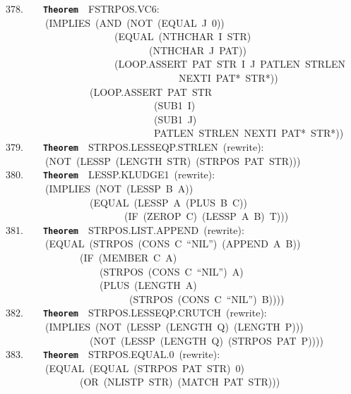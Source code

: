 \documentclass[11pt]{book}
\newenvironment{pubasis}{\begin{flushleft}\ttfamily\small}{\normalsize\rmfamily\end{flushleft}}
\newcommand{\axiomordefinition}[1]{\vspace{6pt}\texttt{\textbf{#1}}}
\begin{document}
\begin{pubasis}
378.~~~~\axiomordefinition{Theorem}~~FSTRPOS.VC6:\\
~~~~~~~~(IMPLIES~(AND~(NOT~(EQUAL~J~0))\\
~~~~~~~~~~~~~~~~~~~~~~(EQUAL~(NTHCHAR~I~STR)\\
~~~~~~~~~~~~~~~~~~~~~~~~~~~~~(NTHCHAR~J~PAT))\\
~~~~~~~~~~~~~~~~~~~~~~(LOOP.ASSERT~PAT~STR~I~J~PATLEN~STRLEN\\
~~~~~~~~~~~~~~~~~~~~~~~~~~~~~~~~~~~NEXTI~PAT*~STR*))\\
~~~~~~~~~~~~~~~~~(LOOP.ASSERT~PAT~STR\\
~~~~~~~~~~~~~~~~~~~~~~~~~~~~~~(SUB1~I)\\
~~~~~~~~~~~~~~~~~~~~~~~~~~~~~~(SUB1~J)\\
~~~~~~~~~~~~~~~~~~~~~~~~~~~~~~PATLEN~STRLEN~NEXTI~PAT*~STR*))\\

379.~~~~\axiomordefinition{Theorem}~~STRPOS.LESSEQP.STRLEN~(rewrite):\\
~~~~~~~~(NOT~(LESSP~(LENGTH~STR)~(STRPOS~PAT~STR)))\\

380.~~~~\axiomordefinition{Theorem}~~LESSP.KLUDGE1~(rewrite):\\
~~~~~~~~(IMPLIES~(NOT~(LESSP~B~A))\\
~~~~~~~~~~~~~~~~~(EQUAL~(LESSP~A~(PLUS~B~C))\\
~~~~~~~~~~~~~~~~~~~~~~~~(IF~(ZEROP~C)~(LESSP~A~B)~T)))\\

381.~~~~\axiomordefinition{Theorem}~~STRPOS.LIST.APPEND~(rewrite):\\
~~~~~~~~(EQUAL~(STRPOS~(CONS~C~``NIL'')~(APPEND~A~B))\\
~~~~~~~~~~~~~~~(IF~(MEMBER~C~A)\\
~~~~~~~~~~~~~~~~~~~(STRPOS~(CONS~C~``NIL'')~A)\\
~~~~~~~~~~~~~~~~~~~(PLUS~(LENGTH~A)\\
~~~~~~~~~~~~~~~~~~~~~~~~~(STRPOS~(CONS~C~``NIL'')~B))))\\

382.~~~~\axiomordefinition{Theorem}~~STRPOS.LESSEQP.CRUTCH~(rewrite):\\
~~~~~~~~(IMPLIES~(NOT~(LESSP~(LENGTH~Q)~(LENGTH~P)))\\
~~~~~~~~~~~~~~~~~(NOT~(LESSP~(LENGTH~Q)~(STRPOS~PAT~P))))\\

383.~~~~\axiomordefinition{Theorem}~~STRPOS.EQUAL.0~(rewrite):\\
~~~~~~~~(EQUAL~(EQUAL~(STRPOS~PAT~STR)~0)\\
~~~~~~~~~~~~~~~(OR~(NLISTP~STR)~(MATCH~PAT~STR)))\\


\end{pubasis}
\end{document}

